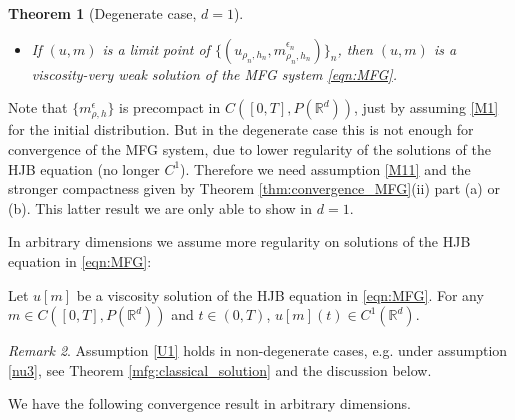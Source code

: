 \documentclass[a4paper,  twoside, 10pt, leqno]{amsart}
\newcommand{\R}{\mathbb{R}}
\newcommand{\rd}{\mathbb{R}^d}
\newtheorem{thm}{Theorem}[section]
\theoremstyle{remark}
\newtheorem{remark}[thm]{Remark}
\theoremstyle{definition}
\newenvironment{description*}%
  {\begin{description}
    \setlength{\itemsep}{0.33em}
  }
  {\end{description}}
\begin{document}
\begin{thm}[Degenerate case, $d=1$]
\begin{itemize}
\item[(iii)] If $(u,m)$ is a limit point of $\{(u_{\rho_n,h_n}, m^{\epsilon_n}_{\rho_n,h_n})\}_n$, then $(u,m)$ is a viscosity-very weak solution of the MFG system \eqref{eqn:MFG}.
\end{itemize}
\end{thm}

Note that $\{m^{\epsilon}_{\rho,h}\}$ is precompact  in $C([0,T], P(\rd))$, 
just by assuming \ref{M1} for the initial distribution. But in the degenerate case 
this is not enough for convergence of the MFG system, due to lower regularity 
 of the solutions of the HJB equation (no longer $C^1$).  
Therefore we need assumption \ref{M11} and the stronger compactness given by Theorem \ref{thm:convergence_MFG}(ii) part (a) or (b).  
This latter result we are only able to show in $d=1$.


In arbitrary dimensions we assume more regularity on solutions of the HJB equation in \eqref{eqn:MFG}:  \smallskip

\begin{description*}
\item[(U)\label{U1}] Let $u[m]$ be a  
viscosity solution of the HJB equation in \eqref{eqn:MFG}. For any $m \in C([0,T],P(\rd))$ and $t\in(0,T)$, $u[m](t)\in C^1(\rd)$. 
\end{description*}

\begin{remark}
Assumption \ref{U1} holds in non-degenerate cases, e.g. under assumption \ref{nu3}, see Theorem \ref{mfg:classical_solution} and the discussion below.
\end{remark}  
We have the following convergence result in arbitrary dimensions.
\end{document}
